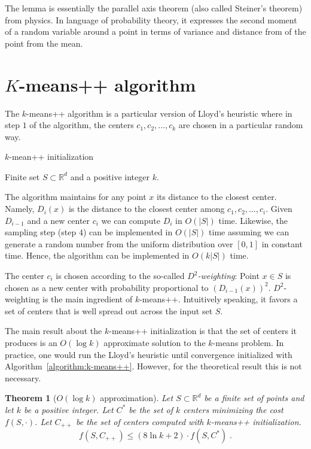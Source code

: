\documentclass{article}
\newtheorem{theorem}[lemma]{Theorem}
\newcommand{\R}{\mathbb{R}}
\newcommand{\norm}[1]{\|{#1}\|}
\begin{document}
The lemma is essentially the parallel axis theorem (also called Steiner's
theorem) from physics. In language of probability theory, it expresses the
second moment of a random variable around a point in terms of variance and
distance from of the point from the mean.

\section{$K$-means++ algorithm}

The $k$-means++ algorithm is a particular version of Lloyd's heuristic where in
step $1$ of the algorithm, the centers $c_1, c_2, \dots, c_k$ are chosen
in a particular random way.

\begin{algorithm}[h]
\caption{$k$-mean++ initialization \label{algorithm:k-means++}}
\begin{algorithmic}[1]
{
\REQUIRE Finite set $S \subset \R^d$ and a positive integer $k$.
\STATE{For any $x \in S$ define $D_{i-1}(x) = \min_{1 \le j \le i-1} \norm{x - c_j}$}
\ENDFOR
}
\end{algorithmic}
\end{algorithm}

The algorithm maintains for any point $x$ its distance to the closest center.
Namely, $D_i(x)$ is the distance to the closest center among $c_1, c_2, \dots,
c_i$. Given $D_{i-1}$ and a new center $c_i$ we can compute $D_i$ in $O(|S|)$
time. Likewise, the sampling step (step $4$) can be implemented in $O(|S|)$
time assuming we can generate a random number from the uniform distribution
over $[0,1]$ in constant time. Hence, the algorithm can be implemented in
$O(k|S|)$ time.

The center $c_i$ is chosen according to the so-called \emph{$D^2$-weighting}:
Point $x \in S$ is chosen as a new center with probability proportional to
$(D_{i-1}(x))^2$. $D^2$-weighting is the main ingredient of $k$-means++.
Intuitively speaking, it favors a set of centers that is well spread out across
the input set $S$.

The main result about the $k$-means++ initialization is that the set of centers
it produces is an $O(\log k)$ approximate solution to the $k$-means problem. In
practice, one would run the Lloyd's heuristic until convergence initialized
with Algorithm~\ref{algorithm:k-means++}.  However, for the theoretical result
this is not necessary.

\begin{theorem}[$O(\log k)$ approximation]
Let $S \subset \R^d$ be a finite set of points and let $k$ be a positive integer.
Let $C^*$ be the set of $k$ centers minimizing the cost $f(S,\cdot)$.
Let $C_{++}$ be the set of centers computed with $k$-means++ initialization.
$$
f(S, C_{++}) \le (8 \ln k + 2) \cdot f(S, C^*) \; .
$$
\end{theorem}
\end{document}
